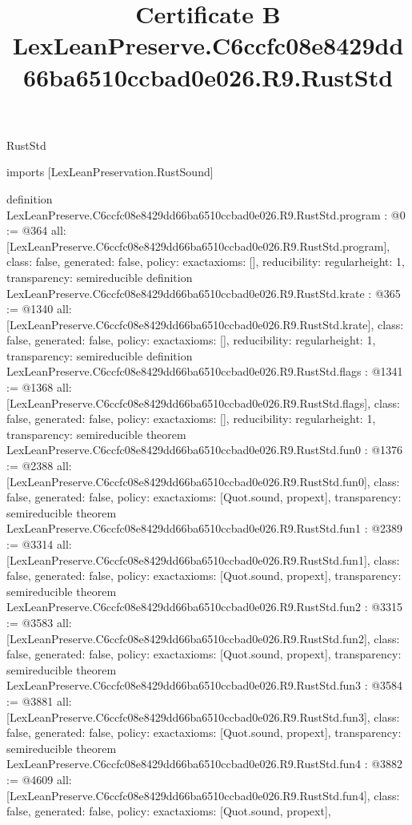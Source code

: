\begin{lexlean}{RustStd}
\title{Certificate B LexLeanPreserve.C6ccfc08e8429dd66ba6510ccbad0e026.R9.RustStd}
\begin{coremodule}
imports [LexLeanPreservation.RustSound]

definition LexLeanPreserve.C6ccfc08e8429dd66ba6510ccbad0e026.R9.RustStd.program : @0 := @364 {
  all: [LexLeanPreserve.C6ccfc08e8429dd66ba6510ccbad0e026.R9.RustStd.program],
  class: false,
  generated: false,
  policy: exact{axioms: []},
  reducibility: regular{height: 1},
  transparency: semireducible
}
definition LexLeanPreserve.C6ccfc08e8429dd66ba6510ccbad0e026.R9.RustStd.krate : @365 := @1340 {
  all: [LexLeanPreserve.C6ccfc08e8429dd66ba6510ccbad0e026.R9.RustStd.krate],
  class: false,
  generated: false,
  policy: exact{axioms: []},
  reducibility: regular{height: 1},
  transparency: semireducible
}
definition LexLeanPreserve.C6ccfc08e8429dd66ba6510ccbad0e026.R9.RustStd.flags : @1341 := @1368 {
  all: [LexLeanPreserve.C6ccfc08e8429dd66ba6510ccbad0e026.R9.RustStd.flags],
  class: false,
  generated: false,
  policy: exact{axioms: []},
  reducibility: regular{height: 1},
  transparency: semireducible
}
theorem LexLeanPreserve.C6ccfc08e8429dd66ba6510ccbad0e026.R9.RustStd.fun0 : @1376 := @2388 {
  all: [LexLeanPreserve.C6ccfc08e8429dd66ba6510ccbad0e026.R9.RustStd.fun0],
  class: false,
  generated: false,
  policy: exact{axioms: [Quot.sound, propext]},
  transparency: semireducible
}
theorem LexLeanPreserve.C6ccfc08e8429dd66ba6510ccbad0e026.R9.RustStd.fun1 : @2389 := @3314 {
  all: [LexLeanPreserve.C6ccfc08e8429dd66ba6510ccbad0e026.R9.RustStd.fun1],
  class: false,
  generated: false,
  policy: exact{axioms: [Quot.sound, propext]},
  transparency: semireducible
}
theorem LexLeanPreserve.C6ccfc08e8429dd66ba6510ccbad0e026.R9.RustStd.fun2 : @3315 := @3583 {
  all: [LexLeanPreserve.C6ccfc08e8429dd66ba6510ccbad0e026.R9.RustStd.fun2],
  class: false,
  generated: false,
  policy: exact{axioms: [Quot.sound, propext]},
  transparency: semireducible
}
theorem LexLeanPreserve.C6ccfc08e8429dd66ba6510ccbad0e026.R9.RustStd.fun3 : @3584 := @3881 {
  all: [LexLeanPreserve.C6ccfc08e8429dd66ba6510ccbad0e026.R9.RustStd.fun3],
  class: false,
  generated: false,
  policy: exact{axioms: [Quot.sound, propext]},
  transparency: semireducible
}
theorem LexLeanPreserve.C6ccfc08e8429dd66ba6510ccbad0e026.R9.RustStd.fun4 : @3882 := @4609 {
  all: [LexLeanPreserve.C6ccfc08e8429dd66ba6510ccbad0e026.R9.RustStd.fun4],
  class: false,
  generated: false,
  policy: exact{axioms: [Quot.sound, propext]},
}
\end{coremodule}
\end{lexlean}
